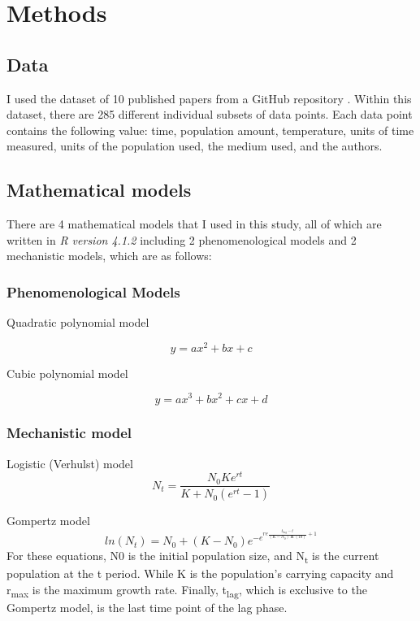 \documentclass[11pt]{article}
\begin{document}
   \section{Methods}

  \subsection*{Data}
  I used the dataset of 10 published papers from a GitHub repository \cite{mhasoba_multilingual_2022}. 
  Within this dataset, there are 285 different individual subsets of data points.
  Each data point contains the following value: time, population amount, temperature, units of time measured, units of the population used, the medium used, and the authors. 

  \subsection*{Mathematical models}
  There are 4 mathematical models that I used in this study, all of which are written in \textit{R version 4.1.2} including 2 phenomenological models and 2 mechanistic models, which are as follows:  
  \subsubsection*{Phenomenological Models}
  \noindent Quadratic polynomial model

    \begin{equation}
        y = ax^{2} + bx + c
    \end{equation}

    \noindent Cubic polynomial model
    
    \begin{equation}
        y = ax^{3} + bx^{2} + cx + d
    \end{equation}

  \subsubsection*{Mechanistic model}

  \noindent Logistic (Verhulst) model \cite{peleg2011microbial}
    \begin{equation}
        N_t = \frac{N_0Ke^{rt}}{K + N_0(e^{rt} - 1)}
    \end{equation}

  \noindent Gompertz model \cite{zwietering1990modeling}
    \begin{equation}
        ln(N_t) = N_0 + (K - N_0)e^{-e^{re\frac{t_{lag} - t}{(K - N_0)\ln(10)} + 1}}
    \end{equation}
    For these equations, N0 is the initial population size, and N\textsubscript{t} is the current population at the t period. While K is the population's carrying capacity and r\textsubscript{max} is the maximum growth rate. Finally, t\textsubscript{lag}, which is exclusive to the Gompertz model, is the last time point of the lag phase.
  
\end{document}
